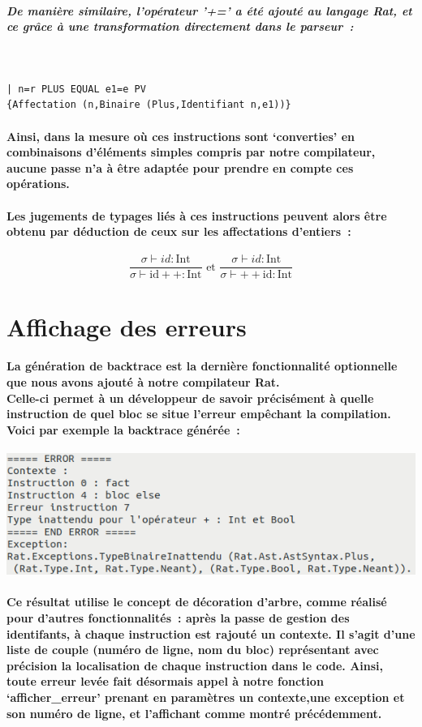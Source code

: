 \documentclass[french]{article}
\newcommand{\jugementIncrementPost}{
        \dfrac{\sigma \vdash id : \text{Int}}
              {\sigma \vdash \text{id}++ : \text{Int}}
        }
\newcommand{\jugementIncrementPre}{
        \dfrac{\sigma \vdash id : \text{Int}}
              {\sigma \vdash ++\text{id} : \text{Int}}
        }
\begin{document}
\subparagraph*{De manière similaire, l'opérateur '+=' a été ajouté au langage Rat, et ce grâce à une transformation directement dans le parseur~:}
\,
\begin{lstlisting}
| n=r PLUS EQUAL e1=e PV 
{Affectation (n,Binaire (Plus,Identifiant n,e1))}
\end{lstlisting}

\paragraph*{Ainsi, dans la mesure où ces instructions sont `converties' en combinaisons d'éléments simples compris par notre compilateur, aucune passe n'a
à être adaptée pour prendre en compte ces opérations.}
\paragraph*{Les jugements de typages liés à ces instructions peuvent alors être obtenu par déduction de ceux sur les affectations d'entiers~:}
\[\jugementIncrementPost \text{ et } \jugementIncrementPre\]

\section{Affichage des erreurs}
\paragraph*{La génération de backtrace est la dernière fonctionnalité optionnelle que nous avons ajouté à notre compilateur Rat. \\
Celle-ci permet à un développeur de savoir précisément à quelle instruction de quel bloc se situe l'erreur empêchant la compilation. 
Voici par exemple la backtrace générée~:}

\begin{center}
        
\end{center}
\includegraphics[width=\textwidth]{backtrace.png}

\paragraph*{Ce résultat utilise le concept de décoration d'arbre, comme réalisé pour d'autres fonctionnalités~: après la passe de gestion des identifants,
à chaque instruction est rajouté un contexte. Il s'agit d'une liste de couple (numéro de ligne, nom du bloc) représentant avec précision la localisation
de chaque instruction dans le code. Ainsi, toute erreur levée fait désormais appel à notre fonction `afficher\_erreur' prenant en paramètres
un contexte,une exception et son numéro de ligne, et l'affichant comme montré précédemment.}
\end{document}
